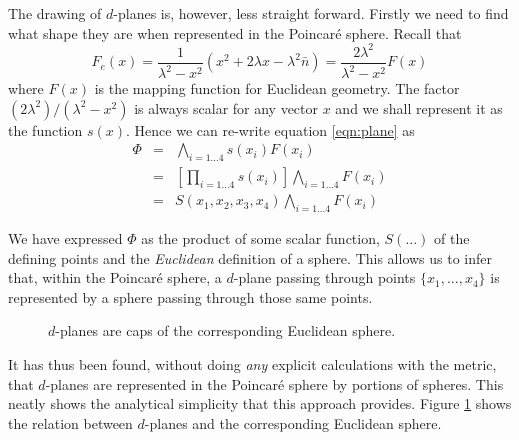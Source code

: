 The drawing of $d$-planes is, however, less straight forward. Firstly we
need to find what shape they are when represented in the Poincar\'e sphere.
Recall that
\[
F_e(x) = \frac{1}{\lambda^2 - x^2} (x^2 + 2\lambda x - \lambda^2\bar{n})
 =  \frac{2\lambda^2}{\lambda^2 - x^2} F(x)
\]
where $F(x)$ is the mapping function for Euclidean geometry. The factor
$(2\lambda^2) / (\lambda^2 - x^2)$ is always scalar for any vector
$x$ and we shall represent it as the function $s(x)$. Hence we can
re-write equation \ref{eqn:plane} as
\begin{eqnarray}
\Phi & = & \bigwedge_{i = 1...4} s(x_i)F(x_i) \\
     & = & \left[\prod_{i = 1...4} s(x_i)\right] \bigwedge_{i = 1...4} F(x_i) \\
     & = & S(x_1, x_2, x_3, x_4) \bigwedge_{i = 1...4} F(x_i) 
\end{eqnarray}

We have expressed $\Phi$ as the product of some scalar function, $S(...)$
of the defining points and the \emph{Euclidean} definition of a sphere. This
allows us to infer that, within the Poincar\'e sphere, a $d$-plane passing
through points $\{x_1, ..., x_4\}$ is represented by a sphere passing
through those same points.

\begin{figure} \centering
{}
\caption{$d$-planes are caps of the corresponding Euclidean sphere.}
\label{fig:dplane}
\end{figure}

It has thus been found, without doing \emph{any} explicit calculations with
the metric, that
$d$-planes are represented in the Poincar\'e sphere by portions of spheres.
This neatly shows the analytical simplicity that this approach provides.
Figure \ref{fig:dplane} shows the
relation between $d$-planes and the corresponding Euclidean sphere.


